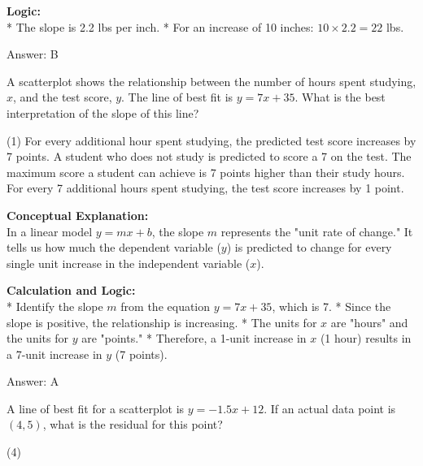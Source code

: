 \documentclass[11pt,paper=a4,answers]{exam}
\begin{document}
\begin{questions}
\begin{solution}
\textbf{Logic:} \\
* The slope is 2.2 lbs per inch.
* For an increase of 10 inches: $10 \times 2.2 = 22$ lbs.

\vspace{30pt}

Answer: \colorbox{yellow!100}{B}
\end{solution}

\question
A scatterplot shows the relationship between the number of hours spent studying, $x$, and the test score, $y$. The line of best fit is $y = 7x + 35$. What is the best interpretation of the slope of this line?
\begin{tasks}(1)
    \task For every additional hour spent studying, the predicted test score increases by 7 points.
    \task A student who does not study is predicted to score a 7 on the test.
    \task The maximum score a student can achieve is 7 points higher than their study hours.
    \task For every 7 additional hours spent studying, the test score increases by 1 point.
\end{tasks}

\begin{solution}
\textbf{Conceptual Explanation:} \\
In a linear model $y = mx + b$, the slope $m$ represents the "unit rate of change." It tells us how much the dependent variable ($y$) is predicted to change for every single unit increase in the independent variable ($x$).

\vspace{30pt}

\textbf{Calculation and Logic:} \\
* Identify the slope $m$ from the equation $y = 7x + 35$, which is 7.
* Since the slope is positive, the relationship is increasing.
* The units for $x$ are "hours" and the units for $y$ are "points."
* Therefore, a 1-unit increase in $x$ (1 hour) results in a 7-unit increase in $y$ (7 points).

\vspace{30pt}

Answer: \colorbox{yellow!100}{A}
\end{solution}

\vspace{60pt}

\question
A line of best fit for a scatterplot is $y = -1.5x + 12$. If an actual data point is $(4, 5)$, what is the residual for this point?
\begin{tasks}(4)
\end{tasks}


\end{questions}
\end{document}
